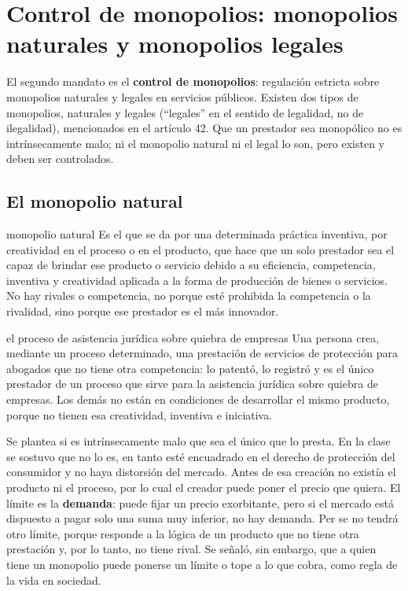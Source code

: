 \documentclass[12pt,oneside]{book}
\begin{document}
\section{Control de monopolios: monopolios naturales y monopolios legales}

El segundo mandato es el \textbf{control de monopolios}: regulaci\'on estricta sobre monopolios naturales y legales en servicios p\'ublicos. Existen dos tipos de monopolios, naturales y legales (``legales'' en el sentido de legalidad, no de ilegalidad), mencionados en el art\'iculo 42. Que un prestador sea monop\'olico no es intr\'insecamente malo; ni el monopolio natural ni el legal lo son, pero existen y deben ser controlados.

\subsection{El monopolio natural}

\begin{definition}{monopolio natural}
Es el que se da por una determinada pr\'actica inventiva, por creatividad en el proceso o en el producto, que hace que un solo prestador sea el capaz de brindar ese producto o servicio debido a su eficiencia, competencia, inventiva y creatividad aplicada a la forma de producci\'on de bienes o servicios. No hay rivales o competencia, no porque est\'e prohibida la competencia o la rivalidad, sino porque ese prestador es el m\'as innovador.
\end{definition}

\begin{example}{el proceso de asistencia jur\'idica sobre quiebra de empresas}
Una persona crea, mediante un proceso determinado, una prestaci\'on de servicios de protecci\'on para abogados que no tiene otra competencia: lo patent\'o, lo registr\'o y es el \'unico prestador de un proceso que sirve para la asistencia jur\'idica sobre quiebra de empresas. Los dem\'as no est\'an en condiciones de desarrollar el mismo producto, porque no tienen esa creatividad, inventiva e iniciativa.

Se plantea si es intr\'insecamente malo que sea el \'unico que lo presta. En la clase se sostuvo que no lo es, en tanto est\'e encuadrado en el derecho de protecci\'on del consumidor y no haya distorsi\'on del mercado. Antes de esa creaci\'on no exist\'ia el producto ni el proceso, por lo cual el creador puede poner el precio que quiera. El l\'imite es la \textbf{demanda}: puede fijar un precio exorbitante, pero si el mercado est\'a dispuesto a pagar solo una suma muy inferior, no hay demanda. Per se no tendr\'a otro l\'imite, porque responde a la l\'ogica de un producto que no tiene otra prestaci\'on y, por lo tanto, no tiene rival. Se se\~nal\'o, sin embargo, que a quien tiene un monopolio puede ponerse un l\'imite o tope a lo que cobra, como regla de la vida en sociedad.%
\end{example}
\end{document}
